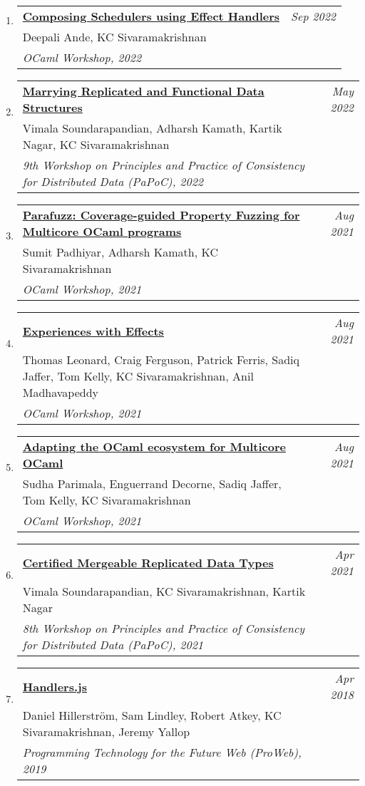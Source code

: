 \documentclass[10pt]{article}
\makeatletter
\newcommand{\lbar}[1]{{\color{#1}\ding{118}}\hspace*{2pt}}
\newenvironment{benumerate}[2]{
    \let\oldItem\item
    \def\item{\addtocounter{enumi}{-2}\oldItem}
    \begin{enumerate}[#2] \itemsep3pt
    \setcounter{enumi}{#1}
    \addtocounter{enumi}{1}}
  {\end{enumerate}}
\newenvironment{publication}[5]
{ \item
  \begin{tabular*}{7.5in}{p{6.3in}@{\extracolsep{\fill}}r}
    \href{#1}{\textbf{#2}} & \textit{#3}\\ #4 &\\ \textit{#5}&\\
  \end{tabular*}
} {}
\newenvironment{region}[3]{%
  \vspace*{0.5ex}
  {\scalebox{1.4}{\textbf{#1}}}
  \begin{benumerate}{#3}{\color{RoyalBlue}#2}}
  {\end{benumerate}\vspace{0.8ex}}
\makeatother
\begin{document}
\begin{region} {\lbar{purple}Workshop Publications}{{W}1}{21}

	\begin{publication}{https://kcsrk.info/papers/compose_ocaml22.pdf}
		{Composing Schedulers using Effect Handlers}
		{Sep 2022}{Deepali Ande, KC Sivaramakrishnan}
		{OCaml Workshop, 2022}
	\end{publication}

	\begin{publication}{https://kcsrk.info/papers/papoc22.pdf}
		{Marrying Replicated and Functional Data Structures}
		{May 2022}{Vimala Soundarapandian, Adharsh Kamath, Kartik Nagar, KC Sivaramakrishnan}
		{9th Workshop on Principles and Practice of Consistency for Distributed Data (PaPoC), 2022}
	\end{publication}

	\begin{publication}{https://kcsrk.info/papers/ocaml2021a.pdf}
		{Parafuzz: Coverage-guided Property Fuzzing for Multicore OCaml programs}
		{Aug 2021}{Sumit Padhiyar, Adharsh Kamath, KC Sivaramakrishnan}
		{OCaml Workshop, 2021}
	\end{publication}

	\begin{publication}{https://kcsrk.info/papers/ocaml2021b.pdf}
		{Experiences with Effects}
		{Aug 2021}{Thomas Leonard, Craig Ferguson, Patrick Ferris, Sadiq Jaffer, Tom Kelly, KC Sivaramakrishnan, Anil Madhavapeddy}
		{OCaml Workshop, 2021}
	\end{publication}

	\begin{publication}{https://kcsrk.info/papers/ocaml2021c.pdf}
		{Adapting the OCaml ecosystem for Multicore OCaml}
		{Aug 2021}{Sudha Parimala, Enguerrand Decorne, Sadiq Jaffer, Tom Kelly, KC Sivaramakrishnan}
		{OCaml Workshop, 2021}
	\end{publication}

	\begin{publication}{http://kcsrk.info/papers/papoc21.pdf}
		{Certified Mergeable Replicated Data Types}
		{Apr 2021}{Vimala Soundarapandian, KC Sivaramakrishnan, Kartik Nagar}
		{8th Workshop on Principles and Practice of Consistency for Distributed Data (PaPoC), 2021}
	\end{publication}

	\begin{publication}{http://kcsrk.info/papers/handlers_js-proweb2018.pdf}
		{Handlers.js}
		{Apr 2018}{Daniel Hillerström, Sam Lindley, Robert Atkey, KC Sivaramakrishnan, Jeremy Yallop}
		{Programming Technology for the Future Web (ProWeb), 2019}
	\end{publication}


\end{region}
\end{document}
